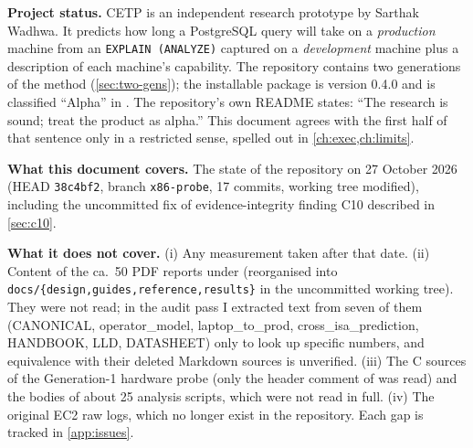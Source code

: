 \textbf{Project status.} CETP is an independent research prototype by Sarthak Wadhwa. It predicts how long a PostgreSQL
query will take on a \emph{production} machine from an \texttt{EXPLAIN (ANALYZE)} captured on a
\emph{development} machine plus a description of each machine's capability. The repository contains
two generations of the method (\cref{sec:two-gens}); the installable package is version 0.4.0 and is
classified ``Alpha'' in . The repository's own README states: ``The research is
sound; treat the product as alpha.'' This document agrees with the first half of that sentence only
in a restricted sense, spelled out in \cref{ch:exec,ch:limits}.

\textbf{What this document covers.} The state of the repository on 27 October 2026 (HEAD
\texttt{38c4bf2}, branch \texttt{x86-probe}, 17 commits, working tree modified), including the
uncommitted fix of evidence-integrity finding C10 described in \cref{sec:c10}.

\textbf{What it does not cover.} (i) Any measurement taken after that date. (ii) Content of the ca.\ 50
PDF reports under  (reorganised into \texttt{docs/\{design,guides,reference,results\}} in the uncommitted working tree). They were not read; in the audit pass I extracted text from seven of them (CANONICAL, operator\_model, laptop\_to\_prod, cross\_isa\_prediction, HANDBOOK, LLD, DATASHEET) only to look up specific numbers, and equivalence with their deleted Markdown sources is unverified. (iii) The C
sources of the Generation-1 hardware probe (only the header comment of  was read) and the bodies of about 25 analysis scripts, which were not
read in full. (iv) The original EC2 raw logs, which no longer exist in the repository. Each gap is
tracked in \cref{app:issues}.

\tableofcontents
\listoffigures
\listoftables

